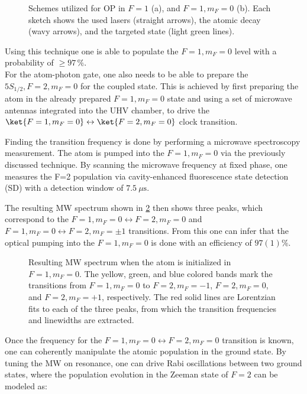 \begin{figure}[htbp]
	\centering
	
	\caption{Schemes utilized for OP in $F=1$ (a), and $F=1, m_F=0$ (b). Each sketch shows the used lasers (straight arrows), the atomic decay (wavy arrows), and the targeted state (light green lines).}
	\label{fig:transition_schema}
\end{figure}

Using this technique one is able to populate the $F=1,m_F=0$ level with a probability of $\geq 97\,\%$.\cite{GianvitoC2026}\\

For the atom-photon gate, one also needs to be able to prepare the $5 S_{1/2}, F=2, m_F = 0$ for the coupled state. This is achieved by first preparing the atom in the already prepared $F=1, m_F=0$ state and using a set of microwave antennas integrated into the UHV chamber, to drive the $\ket{F=1,m_F=0}\leftrightarrow\ket{F=2,m_F=0}$ clock transition.

Finding the transition frequency is done by performing a microwave spectroscopy measurement. The atom is pumped into the $F=1, m_F=0$ via the previously discussed technique. By scanning the microwave frequency at fixed phase, one measures the F=2 population via cavity-enhanced fluorescence state detection (SD) with a detection window of $\SI{7.5}{\mu\second}$.

The resulting MW spectrum shown in \ref{fig:mw_spectroscopy} then shows three peaks, which correspond to the $F=1, m_F=0 \leftrightarrow F=2,m_F=0$ and $F=1,m_F=0\leftrightarrow F=2,m_F=\pm1$ transitions. From this one can infer that the optical pumping into the $F=1,m_F=0$ is done with an efficiency of $97(1)\%$.\cite{GianvitoC2026}

\begin{figure}[htpb]
	\centering
	
	\caption{Resulting MW spectrum when the atom is initialized in $F=1, m_F=0$. The yellow, green, and blue colored bands mark the transitions from $F=1, m_F=0$ to $F=2, m_F=-1$, $F=2, m_F=0$, and $F=2, m_F=+1$, respectively. The red solid lines are Lorentzian fits to each of the three peaks, from which the transition frequencies and linewidths are extracted.}
	\label{fig:mw_spectroscopy}

\end{figure}

Once the frequency for the $F=1,m_F=0 \leftrightarrow F=2,m_F=0$ transition is known, one can coherently manipulate the atomic population in the ground state. By tuning the MW on resonance, one can drive Rabi oscillations \cite{OpticalResonanceAndTwoLevelAtoms} between two ground states, where the population evolution in the Zeeman state of $F=2$ can be modeled as:\cite{RabiOscillationModel}

